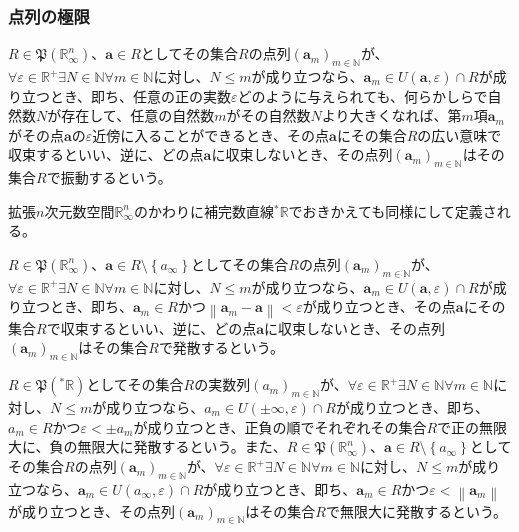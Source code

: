\documentclass[dvipdfmx]{jsarticle}
\begin{document}
\subsubsection{点列の極限}%
\begin{dfn}
$R \in \mathfrak{P}\left( \mathbb{R}_{\infty}^{n} \right)$、$\mathbf{a} \in R$としてその集合$R$の点列$\left( \mathbf{a}_{m} \right)_{m \in \mathbb{N}}$が、$\forall\varepsilon \in \mathbb{R}^{+}\exists N \in \mathbb{N}\forall m \in \mathbb{N}$に対し、$N \leq m$が成り立つなら、$\mathbf{a}_{m} \in U\left( \mathbf{a},\varepsilon \right) \cap R$が成り立つとき、即ち、任意の正の実数$\varepsilon$どのように与えられても、何らかしらで自然数$N$が存在して、任意の自然数$m$がその自然数$N$より大きくなれば、第$m$項$\mathbf{a}_{m}$がその点$\mathbf{a}$の$\varepsilon$近傍に入ることができるとき、その点$\mathbf{a}$にその集合$R$の広い意味で収束するといい、逆に、どの点$\mathbf{a}$に収束しないとき、その点列$\left( \mathbf{a}_{m} \right)_{m \in \mathbb{N}}$はその集合$R$で振動するという。\par
拡張$n$次元数空間$\mathbb{R}_{\infty}^{n}$のかわりに補完数直線${}^{*}\mathbb{R}$でおきかえても同様にして定義される。
\end{dfn}
\begin{dfn}
$R \in \mathfrak{P}\left( \mathbb{R}_{\infty}^{n} \right)$、$\mathbf{a} \in R \setminus \left\{ a_{\infty} \right\}$としてその集合$R$の点列$\left( \mathbf{a}_{m} \right)_{m \in \mathbb{N}}$が、$\forall\varepsilon \in \mathbb{R}^{+}\exists N \in \mathbb{N}\forall m \in \mathbb{N}$に対し、$N \leq m$が成り立つなら、$\mathbf{a}_{m} \in U\left( \mathbf{a},\varepsilon \right) \cap R$が成り立つとき、即ち、$\mathbf{a}_{m} \in R$かつ$\left\| \mathbf{a}_{m} - \mathbf{a} \right\| < \varepsilon$が成り立つとき、その点$\mathbf{a}$にその集合$R$で収束するといい、逆に、どの点$\mathbf{a}$に収束しないとき、その点列$\left( \mathbf{a}_{m} \right)_{m \in \mathbb{N}}$はその集合$R$で発散するという。
\end{dfn}
\begin{dfn}
$R \in \mathfrak{P}\left({}^{*}\mathbb{R} \right)$としてその集合$R$の実数列$\left( a_{m} \right)_{m \in \mathbb{N}}$が、$\forall\varepsilon \in \mathbb{R}^{+}\exists N \in \mathbb{N}\forall m \in \mathbb{N}$に対し、$N \leq m$が成り立つなら、$a_{m} \in U( \pm \infty,\varepsilon) \cap R$が成り立つとき、即ち、$a_{m} \in R$かつ$\varepsilon < \pm a_{m}$が成り立つとき、正負の順でそれぞれその集合$R$で正の無限大に、負の無限大に発散するという。また、$R \in \mathfrak{P}\left( \mathbb{R}_{\infty}^{n} \right)$、$\mathbf{a} \in R \setminus \left\{ a_{\infty} \right\}$としてその集合$R$の点列$\left( \mathbf{a}_{m} \right)_{m \in \mathbb{N}}$が、$\forall\varepsilon \in \mathbb{R}^{+}\exists N \in \mathbb{N}\forall m \in \mathbb{N}$に対し、$N \leq m$が成り立つなら、$\mathbf{a}_{m} \in U\left( a_{\infty},\varepsilon \right) \cap R$が成り立つとき、即ち、$\mathbf{a}_{m} \in R$かつ$\varepsilon < \left\| \mathbf{a}_{m} \right\|$が成り立つとき、その点列$\left( \mathbf{a}_{m} \right)_{m \in \mathbb{N}}$はその集合$R$で無限大に発散するという。
\end{dfn}
\end{document}

